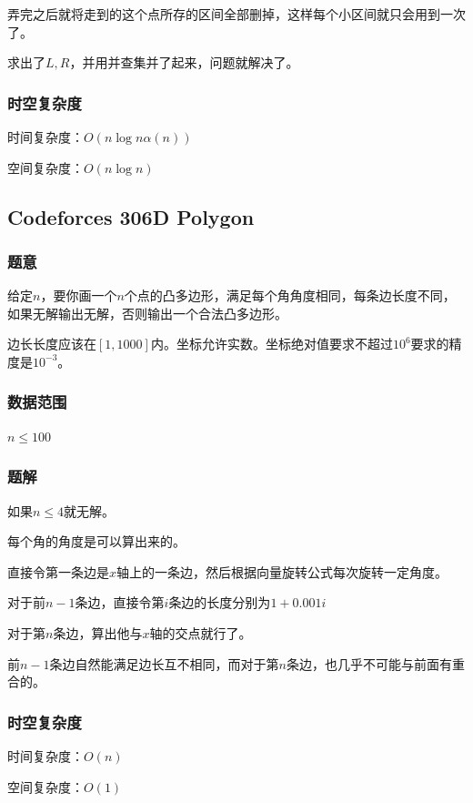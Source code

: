 \documentclass{ctexart}
\begin{document}
弄完之后就将走到的这个点所存的区间全部删掉，这样每个小区间就只会用到一次了。

求出了$L,R$，并用并查集并了起来，问题就解决了。
\subsubsection{时空复杂度}
时间复杂度：$O(n \log n \alpha(n))$

空间复杂度：$O(n \log n)$
\subsection{Codeforces 306D Polygon}
\subsubsection{题意}
给定$n$，要你画一个$n$个点的凸多边形，满足每个角角度相同，每条边长度不同，如果无解输出无解，否则输出一个合法凸多边形。

边长长度应该在$[1,1000]$内。坐标允许实数。坐标绝对值要求不超过$10^6$要求的精度是$10^{-3}$。
\subsubsection{数据范围}
$n \le 100$
\subsubsection{题解}
如果$n \le 4$就无解。

每个角的角度是可以算出来的。

直接令第一条边是$x$轴上的一条边，然后根据向量旋转公式每次旋转一定角度。

对于前$n-1$条边，直接令第$i$条边的长度分别为$1+0.001i$

对于第$n$条边，算出他与$x$轴的交点就行了。

前$n-1$条边自然能满足边长互不相同，而对于第$n$条边，也几乎不可能与前面有重合的。
\subsubsection{时空复杂度}
时间复杂度：$O(n)$

空间复杂度：$O(1)$
\end{document}
